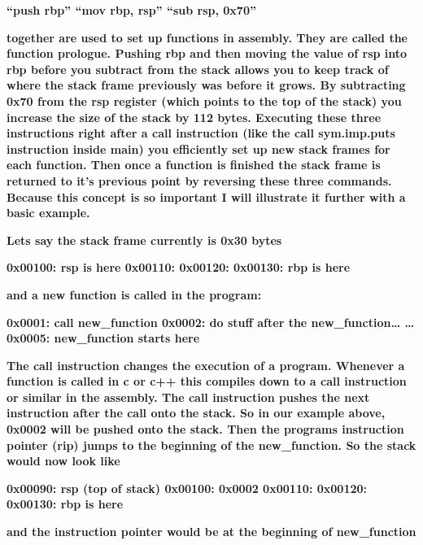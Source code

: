 \documentclass[letterpaper]{article}
\begin{document}
\textbf{{}``push rbp''\newline
{}``mov rbp, rsp''\newline
{}``sub rsp, 0x70''}

\textbf{together are used to set up functions in assembly. They are called the function prologue. Pushing rbp and then
moving the value of rsp into rbp before you subtract from the stack allows you to keep track of where the stack frame
previously was before it grows. By subtracting 0x70 from the rsp register (which points to the top of the stack) you
increase the size of the stack by 112 bytes. Executing these three instructions right after a call instruction (like
the call sym.imp.puts instruction inside main) you efficiently set up new stack frames for each function. Then once a
function is finished the stack frame is returned to it's previous point by reversing these three commands. Because this
concept is so important I will illustrate it further with a basic example.}

\textbf{Lets say the stack frame currently is 0x30 bytes}

\textbf{0x00100: rsp is here\newline
0x00110:\newline
0x00120:\newline
0x00130: rbp is here}

\textbf{and a new function is called in the program:}

\textbf{0x0001: call new\_function\newline
0x0002: do stuff after the new\_function{\dots}\newline
{\dots} 0x0005: new\_function starts here}

\textbf{The call instruction changes the execution of a program. Whenever a function is called in c or c++ this compiles
down to a call instruction or similar in the assembly. The call instruction pushes the next instruction after the call
onto the stack. So in our example above, 0x0002 will be pushed onto the stack. Then the programs instruction pointer
(rip) jumps to the beginning of the new\_function. So the stack would now look like}

\textbf{0x00090: rsp (top of stack)\newline
0x00100: 0x0002\newline
0x00110:\newline
0x00120:\newline
0x00130: rbp is here}

\textbf{and the instruction pointer would be at the beginning of new\_function}
\end{document}

